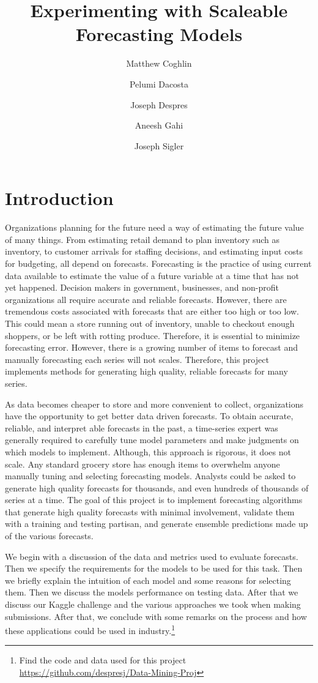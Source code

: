 \documentclass[16pt,twocolumn,letterpaper]{article}
\title{Experimenting with Scaleable Forecasting Models}
\author{
    Matthew Coghlin\\
  	\and
  	Pelumi Dacosta\\
    \and
    Joseph Despres\\
    \and
    Aneesh Gahi\\
    \and
    Joseph Sigler\\
}
\begin{document}

\maketitle



\section{Introduction}

Organizations planning for the future need a way of estimating the future value of many things. From estimating retail demand to plan inventory such as inventory, to customer arrivals for staffing decisions, and estimating input costs for budgeting, all depend on forecasts. Forecasting is the practice of using current data available to estimate the value of a future variable at a time that has not yet happened. Decision makers in government, businesses, and non-profit organizations all require accurate and reliable forecasts. However, there are tremendous costs associated with forecasts that are either too high or too low. This could mean a store running out of inventory, unable to checkout enough shoppers, or be left with rotting produce. Therefore, it is essential to minimize forecasting error. However, there is a growing number of items to forecast and manually forecasting each series will not scales. Therefore, this project implements methods for generating high quality, reliable forecasts for many series. 

As data becomes cheaper to store and more convenient to collect, organizations have the opportunity to get better data driven forecasts. To obtain accurate, reliable, and interpret able forecasts in the past, a time-series expert was generally required to carefully tune model parameters \cite{taylor2018forecasting} and make judgments on which models to implement. Although, this approach is rigorous, it does not scale. Any standard grocery store has enough items to overwhelm anyone manually tuning and selecting forecasting models. Analysts could be asked to generate high quality forecasts for thousands, and even hundreds of thousands of series at a time. The goal of this project is to implement forecasting algorithms that generate high quality forecasts with minimal involvement, validate them with a training and testing partisan, and generate ensemble predictions made up of the various forecasts.

We begin with a discussion of the data and metrics used to evaluate forecasts. Then we specify the requirements for the models to be used for this task. Then we briefly explain the intuition of each model and some reasons for selecting them. Then we discuss the models performance on testing data. After that we discuss our Kaggle challenge and the various approaches we took when making submissions. After that, we conclude with some remarks on the process and how these applications could be used in industry.\footnote{Find the code and data used for this project \url{https://github.com/despresj/Data-Mining-Proj}  } 
\end{document}
